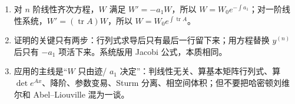 \documentclass[11pt]{ctexart}
\let\origsubhdr\subhdr
\renewcommand{\subhdr}[1]{\needspace{3\baselineskip}\origsubhdr{#1}}
\newcommand{\tr}{\operatorname{tr}}
\begin{document}

\begin{enumerate}
  \item 对 $n$ 阶线性齐次方程，$W$ 满足 $W'=-a_1W$，所以 $W=W_0e^{-\int a_1}$；对一阶线性系统，$W'=(\tr A)W$，所以 $W=W_0e^{\int\tr A}$。
  \item 证明的关键只有两步：行列式求导后只有最后一行留下来；用方程替换 $y^{(n)}$ 后只有 $-a_1$ 项活下来。系统版用 Jacobi 公式，本质相同。
  \item 应用的主线是“$W$ 只由迹/ $a_1$ 决定”：判线性无关、算基本矩阵行列式、算 $\det e^{Ax}$、降阶、参数变易、Sturm 分离、相空间体积；但不要把哈密顿刘维尔和 Abel--Liouville 混为一谈。
\end{enumerate}

\flowerrule
{}
\end{document}
